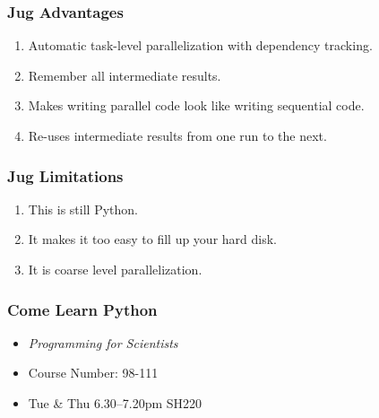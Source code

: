 \documentclass{beamer}
\begin{document}
\begin{frame}[fragile]
\frametitle{Jug Advantages}
\begin{enumerate}
\item Automatic task-level parallelization with dependency tracking.
\item Remember all intermediate results.
\pause
\item Makes writing parallel code look like writing sequential code.
\item Re-uses intermediate results from one run to the next.
\end{enumerate}
\end{frame}

\begin{frame}[fragile]
\frametitle{Jug Limitations}
\begin{enumerate}
\item This is still \alert{Python}.
\item It makes it too easy to fill up your hard disk.
\item It is coarse level parallelization.
\end{enumerate}
\end{frame}

\begin{frame}[fragile]
\frametitle{Come Learn Python}

\begin{itemize}
\item \textit{Programming for Scientists}
\item Course Number: 98-111
\item Tue \& Thu 6.30--7.20pm SH220
\end{itemize}
\end{frame}
\end{document}
